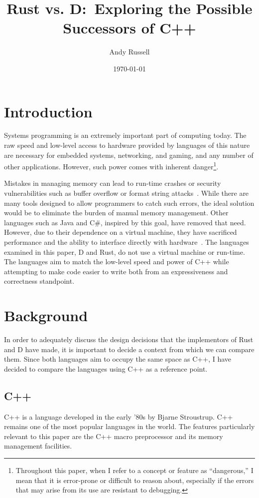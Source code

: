 \documentclass[draftcopy]{srpaper}
\title{Rust vs. D:\ Exploring the Possible Successors of C++}
\author{Andy Russell}
\date{\today}
\begin{document}
\frontmatter

\chapter{Introduction}

Systems programming is an extremely important part of computing today. The raw
speed and low-level access to hardware provided by languages of this nature are
necessary for embedded systems, networking, and gaming, and any number of other
applications. However, such power comes with inherent
danger\footnote{Throughout this paper, when I refer to a concept or feature as
``dangerous,'' I mean that it is error-prone or difficult to reason about,
especially if the errors that may arise from its use are resistant to
debugging.}.

Mistakes in managing memory can lead to run-time crashes or security
vulnerabilities such as buffer overflow or format string
attacks~\cite{Shahriar:2012:MPS:2187671.2187673}. While there are many tools
designed to allow programmers to catch such errors, the ideal solution would be
to eliminate the burden of manual memory management. Other languages such as
Java and C\#, inspired by this goal, have removed that need. However, due to
their dependence on a virtual machine, they have sacrificed performance and the
ability to interface directly with
hardware~\cite{Alexandrescu:2010:DPL:1875434}. The languages examined in this
paper, D and Rust, do not use a virtual machine or run-time. The languages aim
to match the low-level speed and power of C++ while attempting to make code
easier to write both from an expressiveness and correctness standpoint.

\chapter{Background}

In order to adequately discuss the design decisions that the implementors of
Rust and D have made, it is important to decide a context from which we can
compare them. Since both languages aim to occupy the same space as C++, I have
decided to compare the languages using C++ as a reference point.

\section{C++}

C++ is a language developed in the early '80s by Bjarne Stroustrup. C++ remains
one of the most popular languages in the world. The features particularly
relevant to this paper are the C++ macro preprocessor and its memory management
facilities.
\end{document}
